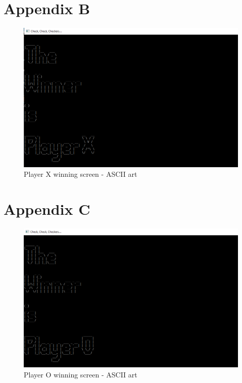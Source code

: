 \documentclass[10pt, a4paper]{article}
\begin{document}
 \section{Appendix B}
  \label{appendix:b}
 \begin{figure}[H]
 	\centering
 	\includegraphics[scale=0.8]{XWin}
 	\caption{Player X winning screen - ASCII art}
 \end{figure}
 \newpage
 \section{Appendix C}
  \label{appendix:c}
 \begin{figure}[H]
 	\centering	
 	\includegraphics[scale=0.8]{OWin}
 	\caption{Player O winning screen - ASCII art}		
 \end{figure}
 \newpage
\end{document}

